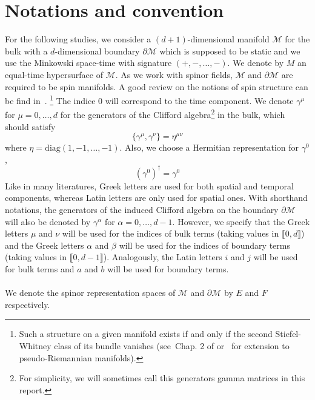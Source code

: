 \section*{Notations and convention}
For the following studies, we consider a $(d+1)$-dimensional manifold $\mathcal{M}$ for the bulk with a $d$-dimensional boundary $\partial \mathcal{M}$ which is supposed to be static and we use the Minkowski space-time with signature $(+, -,\ldots, -)$.
We denote by $M$ an equal-time hypersurface of $\mathcal{M}$.
As we work with spinor fields, $\mathcal{M}$ and $\partial \mathcal{M}$ are required to be spin manifolds. 
A good review on the notions of spin structure can be find in~\cite{Trautman2007}.
\footnote{
Such a structure on a given manifold exists if and only if the second Stiefel-Whitney class of its bundle vanishes (see~\eg Chap. 2 of \cite{Lawson1989} or~\cite{Alagia1985} for extension to pseudo-Riemannian manifolds).}
%
The indice 0 will correspond to the time component.
We denote $\gamma^\mu$ for $\mu = 0, \ldots, d$ for the generators of the Clifford algebra\footnote{
For simplicity, we will sometimes call this generators gamma matrices in this report.
} in the bulk, which should satisfy
\begin{equation*}
\{ \gamma^\mu, \gamma^\nu \} = \eta^{\mu\nu}
\end{equation*} 
where $\eta = \mathrm{diag}(1, -1 ,\ldots, -1)$.
Also, we choose a Hermitian representation for $\gamma^0$, 
\ie
\begin{equation*}
(\gamma^0)^\dagger = \gamma^0
\end{equation*}
Like in many literatures, Greek letters are used for both spatial and temporal components, whereas Latin letters are only used for spatial ones.
With shorthand notations, the generators of the induced Clifford algebra on the boundary $\partial \mathcal{M}$ will also be denoted by $\gamma^\alpha$ for $\alpha = 0 ,\ldots, d-1$. 
However, we specify that the Greek letters $\mu$ and $\nu$ will be used for the indices of bulk terms (taking values in $\llbracket 0, d \rrbracket$) and the Greek letters $\alpha$ and $\beta$ will be used for the indices of boundary terms (taking values in $\llbracket 0, d-1 \rrbracket$).
Analogously, the Latin letters $i $ and $j$ will be used for bulk terms and $a$ and $b$ will be used for boundary terms. \\\\
%
We denote the spinor representation spaces of $\mathcal{M}$ and $\partial \mathcal{M}$ by $E$ and $F$ respectively.

